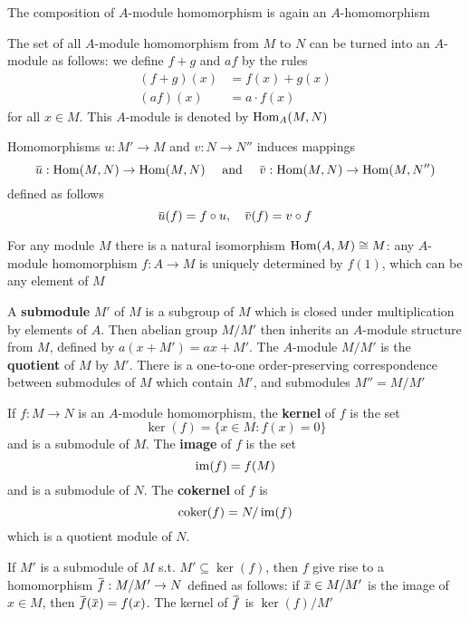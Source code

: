 \documentclass[11pt]{article}
\begin{document}
The composition of \(A\)-module homomorphism is again an \(A\)-homomorphism

The set of all \(A\)-module homomorphism from \(M\) to \(N\) can be turned into an \(A\)-module
as follows: we define \(f+g\) and \(af\) by the rules
\begin{align*}
(f+g)(x)&=f(x)+g(x)\\
(af)(x)&=a\cdot f(x)
\end{align*}
for all \(x\in M\). This \(A\)-module is denoted by \(\operatorname{Hom}_A(M,N)\)

Homomorphisms \(u:M'\to M\) and \(v:N\to N''\) induces mappings
\begin{equation*}
\baru:\Hom(M,N)\to\Hom(M,N)\quad\text{ and }\quad\barv:\Hom(M,N)\to\Hom(M,N'')
\end{equation*}
defined as follows
\begin{equation*}
\baru(f)=f\circ u,\quad\barv(f)=v\circ f
\end{equation*}

For any module \(M\) there is a natural isomorphism \(\operatorname{Hom}(A,M)\cong M\): any \(A\)-module
homomorphism \(f:A\to M\) is uniquely determined by \(f(1)\), which can be any element of \(M\)

A \textbf{submodule} \(M'\) of \(M\) is a subgroup of \(M\) which is closed under multiplication by
elements of \(A\). Then abelian group \(M/M'\) then inherits an \(A\)-module structure
from \(M\), defined by \(a(x+M')=ax+M'\). The \(A\)-module \(M/M'\) is the \textbf{quotient} of \(M\)
by \(M'\). There is a one-to-one order-preserving correspondence between submodules of \(M\)
which contain \(M'\), and submodules \(M''=M/M'\)

If \(f:M\to N\) is an \(A\)-module homomorphism, the \textbf{kernel} of \(f\) is the set
\begin{equation*}
\ker(f)=\{x\in M:f(x)=0\}
\end{equation*}
and is a submodule of \(M\). The \textbf{image} of \(f\) is the set
\begin{equation*}
\operatorname{im}(f)=f(M)
\end{equation*}
and is a submodule of \(N\). The \textbf{cokernel} of \(f\) is
\begin{equation*}
\operatorname{coker}(f)=N/\operatorname{im}(f)
\end{equation*}
which is a quotient module of \(N\).

If \(M'\) is a submodule of \(M\) s.t. \(M'\subseteq\ker(f)\), then \(f\) give rise to a
homomorphism \(\barf:M/M'\to N\) defined as follows: if \(\barx\in M/M'\) is the image of \(x\in M\),
then \(\barf(\barx)=f(x)\). The kernel of \(\barf\) is \(\ker(f)/M'\)
\end{document}
